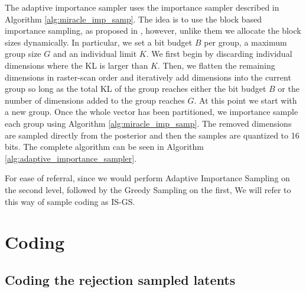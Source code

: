 The adaptive importance sampler uses the importance sampler described in
Algorithm \ref{alg:miracle_imp_samp}. The idea is to use the block based
importance sampling, as proposed in \cite{havasi2018minimal}, however, unlike
them we allocate the block sizes dynamically. In particular, we set a bit
budget $B$ per group, a maximum group size $G$ and an individual limit $K$.
We first begin by discarding individual dimensions where the KL is larger
than $K$. Then, we flatten the remaining dimensions in raster-scan order and 
iteratively add dimensions into the current group so long as the total KL of the
group reaches either the bit budget $B$ or the number of dimensions added to the
group reaches $G$. At this point we start with a new group. Once the whole
vector has been partitioned, we importance sample each group using Algorithm 
\ref{alg:miracle_imp_samp}. The removed dimensions are sampled directly from
the posterior and then the samples are quantized to 16 bits. The complete
algorithm can be seen in Algorithm \ref{alg:adaptive_importance_sampler}.
\par
For ease of referral, since we would perform Adaptive Importance Sampling on the
second level, followed by the Greedy Sampling on the first, We will refer to
this way of sample coding as IS-GS.
\section{Coding}
\label{sec:entropy_coding}
\par

\subsection{Coding the rejection sampled latents}
\label{sec:rej_samp_artihmetic_coding}

